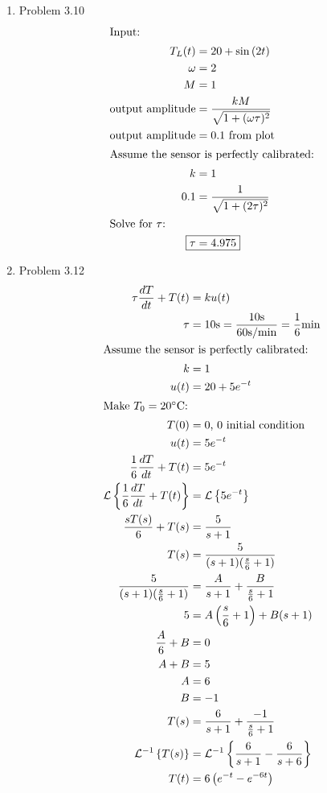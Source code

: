 \documentclass[12pt]{article}
\begin{document}
\begin{enumerate}
\newpage
\item Problem 3.10
    \begin{align*}  
        \intertext{Input:}
        T_L(t) &= 20 + \sin{(2t)} \\
        \omega &= 2 \\
        M &= 1 \\
        \text{output amplitude} &= \frac{kM}{\sqrt{1 + (\omega \tau)^2}} \\
        \text{output amplitude} &= 0.1 \text{ from plot} \\
        \intertext{Assume the sensor is perfectly calibrated:}
        k &= 1 \\
        0.1 &= \frac{1}{\sqrt{1 + (2\tau)^2}} \\
        \intertext{Solve for $\tau$:}
        \Aboxed{\tau &= 4.975}
    \end{align*}


\newpage
\item Problem 3.12
    \begin{align*}
        \tau \frac{dT}{dt} + T(t) &= k u(t) \\
        \tau &= 10\mathrm{s} = \frac{10\mathrm{s}}{60\mathrm{s/min}} = \frac{1}{6}\mathrm{min} \\
        \intertext{Assume the sensor is perfectly calibrated:}
        k &= 1 \\
        u(t) &= 20 + 5e^{-t} \\
        \intertext{Make $T_0 = 20^\circ$C:}
        T(0) &= 0 \text{, 0 initial condition} \\
        u(t) &= 5e^{-t} \\
        \frac{1}{6} \frac{dT}{dt} + T(t) &= 5e^{-t} \\
        \mathcal{L}\left\{ \frac{1}{6} \frac{dT}{dt} + T(t) \right\} &= \mathcal{L}\left\{ 5e^{-t} \right\} \\
        \frac{s T(s)}{6} + T(s) &= \frac{5}{s + 1} \\
        T(s) &= \frac{5}{(s + 1) (\frac{s}{6} + 1)} \\
        \frac{5}{(s + 1) (\frac{s}{6} + 1)} &= \frac{A}{s+1} + \frac{B}{\frac{s}{6} + 1} \\
        5 &= A \left( \frac{s}{6} + 1 \right) + B (s + 1) \\
        \frac{A}{6} + B &= 0 \\
        A + B &= 5 \\
        A &= 6 \\
        B &= -1 \\ 
        T(s) &= \frac{6}{s+1} + \frac{-1}{\frac{s}{6} + 1} \\
        \mathcal{L}^{-1}\left\{ T(s) \right\} &= \mathcal{L}^{-1}\left\{ \frac{6}{s+1} - \frac{6}{s + 6} \right\} \\
        T(t) &= 6 \left(e^{- t} - e^{- 6 t} \right) 
    \end{align*}


\end{enumerate}
\end{document}
